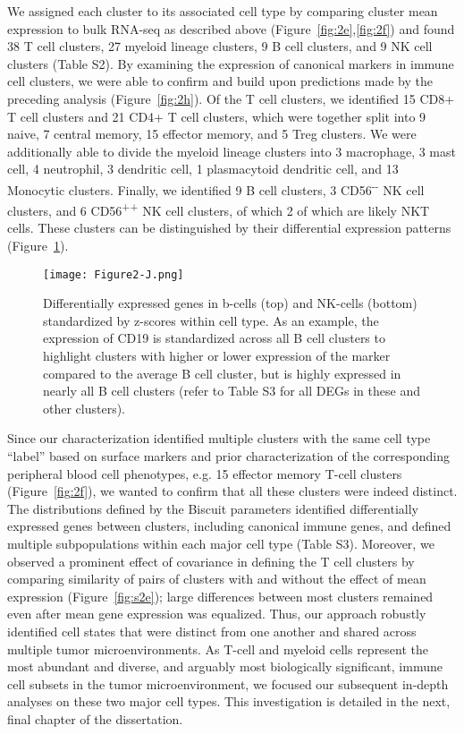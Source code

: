 We assigned each cluster to its associated cell type by comparing cluster mean expression to bulk RNA-seq as described above (Figure~\ref{fig:2e},\ref{fig:2f}) and found 38 T cell clusters, 27 myeloid lineage clusters, 9 B cell clusters, and 9 NK cell clusters (Table S2). %
By examining the expression of canonical markers in immune cell clusters, we were able to confirm and build upon predictions made by the preceding analysis (Figure~\ref{fig:2h}).
Of the T cell clusters, we identified 15 CD8+ T cell clusters and 21 CD4+ T cell clusters, which were together split into 9 naive, 7 central memory, 15 effector memory, and 5 Treg clusters.
We were additionally able to divide the myeloid lineage clusters into 3 macrophage, 3 mast cell, 4 neutrophil, 3 dendritic cell, 1 plasmacytoid dendritic cell, and 13 Monocytic clusters.
Finally, we identified 9 B cell clusters, 3 CD56\textsuperscript{-\/-} NK cell clusters, and 6 CD56\textsuperscript{++} NK cell clusters, of which 2 of which are likely NKT cells.
These clusters can be distinguished by their differential expression patterns (Figure~\ref{fig:2j}).

\begin{figure}
\centering
\texttt{[image: Figure2-J.png]}
  \caption{Differentially expressed genes in b-cells (top) and NK-cells (bottom) standardized by z-scores within cell type.
  As an example, the expression of CD19 is standardized across all B cell clusters to highlight clusters with higher or lower expression of the marker compared to the average B cell cluster, but is highly expressed in nearly all B cell clusters (refer to Table S3 for all DEGs in these and other clusters).
}
\label{fig:2j}
\end{figure}

Since our characterization identified multiple clusters with the same cell type ``label'' based on surface markers and prior characterization of the corresponding peripheral blood cell phenotypes, e.g.  15 effector memory T-cell clusters (Figure~\ref{fig:2f}), we wanted to confirm that all these clusters were indeed distinct.
The distributions defined by the Biscuit parameters identified differentially expressed genes between clusters, including canonical immune genes, and defined multiple subpopulations within each major cell type (Table S3). %
Moreover, we observed a prominent effect of covariance in defining the T cell clusters by comparing similarity of pairs of clusters with and without the effect of mean expression (Figure~\ref{fig:s2e}); large differences between most clusters remained even after mean gene expression was equalized.
Thus, our approach robustly identified cell states that were distinct from one another and shared across multiple tumor microenvironments.
As T-cell and myeloid cells represent the most abundant and diverse, and arguably most biologically significant, immune cell subsets in the tumor microenvironment, we focused our subsequent in-depth analyses on these two major cell types.
This investigation is detailed in the next, final chapter of the dissertation. 

